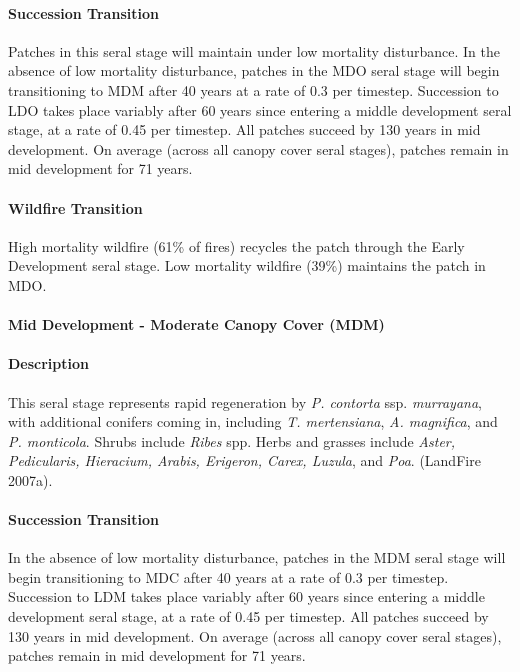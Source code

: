 \paragraph{Succession Transition} Patches in this seral stage will maintain under low mortality disturbance. In the absence of low mortality disturbance, patches in the MDO seral stage will begin transitioning to MDM after 40 years at a rate of 0.3 per timestep. Succession to LDO takes place variably after 60 years since entering a middle development seral stage, at a rate of 0.45 per timestep. All patches succeed by 130 years in mid development.  On average (across all canopy cover seral stages), patches remain in mid development for 71 years.

\paragraph{Wildfire Transition} High mortality wildfire (61\% of fires) recycles the patch through the Early Development seral stage. Low mortality wildfire (39\%) maintains the patch in MDO.

\noindent\hrulefill

\paragraph{Mid Development - Moderate Canopy Cover (MDM)}

\paragraph{Description} This seral stage represents rapid regeneration by \emph{P. contorta} ssp. \emph{murrayana}, with additional conifers coming in, including \emph{T. mertensiana}, \emph{A. magnifica}, and \emph{P. monticola}. Shrubs include \emph{Ribes} spp. Herbs and grasses include \emph{Aster, Pedicularis, Hieracium, Arabis, Erigeron, Carex, Luzula}, and \emph{Poa}. (LandFire 2007a).

\paragraph{Succession Transition} In the absence of low mortality disturbance, patches in the MDM seral stage will begin transitioning to MDC after 40 years at a rate of 0.3 per timestep. Succession to LDM takes place variably after 60 years since entering a middle development seral stage, at a rate of 0.45 per timestep. All patches succeed by 130 years in mid development.  On average (across all canopy cover seral stages), patches remain in mid development for 71 years.
 
